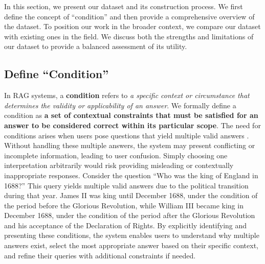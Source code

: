 


In this section, we present our dataset and its construction process. We first define the concept of ``condition'' and then provide a comprehensive overview of the dataset. To position our work in the broader context, we compare our dataset with existing ones in the field. We discuss both the strengths and limitations of our dataset to provide a balanced assessment of its utility.

\subsection{Define ``Condition''}
In RAG systems, a \textbf{condition} refers to \textit{a specific context or circumstance that determines the validity or applicability of an answer}. We formally define a condition as \textbf{a set of contextual constraints that must be satisfied for an answer to be considered correct within its particular scope}. The need for conditions arises when users pose questions that yield multiple valid answers \cite{qian2024tell}. Without handling these multiple answers, the system may present conflicting or incomplete information, leading to user confusion. Simply choosing one interpretation arbitrarily would risk providing misleading or contextually inappropriate responses. Consider the question ``Who was the king of England in 1688?'' This query yields multiple valid answers due to the political transition during that year. James II was king until December 1688, under the condition of the period before the Glorious Revolution, while William III became king in December 1688, under the condition of the period after the Glorious Revolution and his acceptance of the Declaration of Rights. By explicitly identifying and presenting these conditions, the system enables users to understand why multiple answers exist, select the most appropriate answer based on their specific context, and refine their queries with additional constraints if needed.

